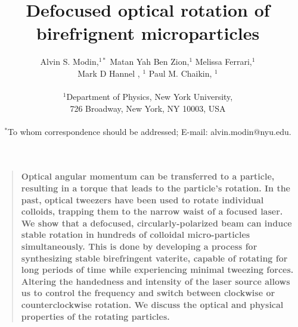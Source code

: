 \documentclass[12pt]{article}
\title{ Defocused optical rotation of birefrignent microparticles    }
\author
{Alvin S. Modin,$^{1\ast}$ Matan Yah Ben Zion,$^{1}$ Melissa Ferrari,$^{1}$ \\ Mark D Hannel , $^{1}$ Paul M. Chaikin, $^{1}$\\
\\
\normalsize{$^{1}$Department of Physics, New York University,}\\
\normalsize{726 Broadway, New York, NY 10003, USA}\\
\\
\normalsize{$^\ast$To whom correspondence should be addressed; E-mail:  alvin.modin@nyu.edu.}
}
\date{}
\newenvironment{sciabstract}{%
\begin{quote} \bf}
{\end{quote}}
\begin{document}
 


\baselineskip24pt


\maketitle 




\begin{sciabstract}
Optical angular momentum can be transferred to a particle, resulting in a torque that leads to the particle's rotation. In the past, optical tweezers have been used to rotate individual colloids, trapping them to the narrow waist of a focused laser. We show that a defocused, circularly-polarized beam can induce stable rotation in hundreds of colloidal micro-particles simultaneously. This is done by developing a process for synthesizing stable birefringent vaterite, capable of rotating for long periods of time while experiencing minimal tweezing forces. Altering the handedness and intensity of the laser source allows us to control the frequency and switch between clockwise or counterclockwise rotation. We discuss the optical and physical properties of the rotating particles.
\end{sciabstract}



\end{document}
